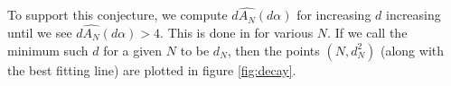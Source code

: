 \documentclass{report}
\theoremstyle{remark}
\numberwithin{equation}{section}
\begin{document}


To support this conjecture, we compute $d \widehat{A_N}(d\alpha)$ for
increasing $d$ increasing until we see $d \widehat{A_N}(d\alpha) > 4$.
This is done in  for various $N$.  If we call the
minimum such $d$ for a given $N$ to be $d_N$, then the points
$(N, d_N^2)$ (along with the best fitting line) are plotted in figure
\ref{fig:decay}.  
\end{document}
